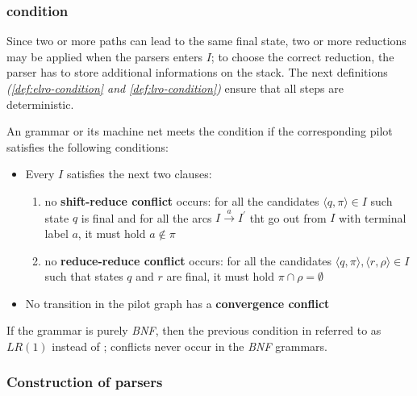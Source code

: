 \documentclass[english]{article}
\begin{document}
\subsubsection[ELR(1) condition]{\elro condition}
\label{sec:elro-condition}

Since two or more paths can lead to the same final state, two or more reductions may be applied when the parsers enters \mstate \(I\);
to choose the correct reduction, the parser has to store additional informations on the stack.
The next definitions \textit{(\ref{def:elro-condition} and \ref{def:lro-condition})} ensure that all steps are deterministic.

\begin{definition}
  \label{def:elro-condition}
  An \EBNF grammar or its machine net meets the condition \textbf{\elro} if the corresponding pilot satisfies the following conditions:
  \begin{itemize}
    \item Every \mstate \(I\) satisfies the next two clauses:
          \begin{enumerate}
            \item no \textbf{shift-reduce conflict} occurs: for all the candidates \(\langle q, \pi \rangle \in I\) such state \(q\) is final and for all the arcs \(I \xrightarrow{a} I^\prime\) tht go out from \(I\) with terminal label \(a\), it must hold \(a \notin \pi\)
            \item no \textbf{reduce-reduce conflict} occurs: for all the candidates \(\langle q, \pi \rangle, \langle r, \rho \rangle \in I\) such that states \(q\) and \(r\) are final, it must hold \(\pi \cap \rho = \emptyset\)
          \end{enumerate}
    \item No transition in the pilot graph has a \textbf{convergence conflict}
  \end{itemize}
\end{definition}

\begin{definition}[\(\textit{LR}(1)\)]
  \label{def:lro-condition}
  If the grammar is purely \textit{BNF}, then the previous condition in referred to as \(\textit{LR}(1)\) instead of \elro;
  conflicts never occur in the \textit{BNF} grammars.
\end{definition}

\subsubsection[Construction of ELR(1) parser]{Construction of \elro parsers}
\end{document}
